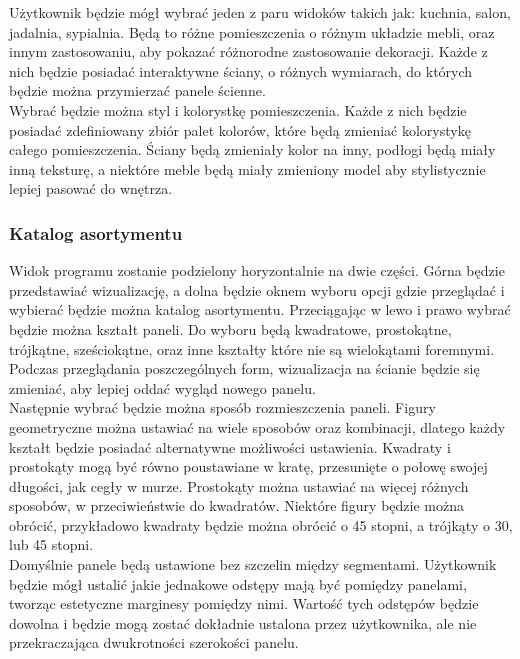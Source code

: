 \documentclass{article} %
\begin{document}
        Użytkownik będzie mógł wybrać jeden z paru widoków takich jak: kuchnia, salon, jadalnia, sypialnia. Będą to różne pomieszczenia o różnym układzie mebli, oraz innym zastosowaniu, aby pokazać różnorodne zastosowanie dekoracji. Każde z nich będzie posiadać interaktywne ściany, o różnych wymiarach, do których będzie można przymierzać panele ścienne.
        \\
        
        Wybrać będzie można styl i kolorystkę pomieszczenia. Każde z nich będzie posiadać zdefiniowany zbiór palet kolorów, które będą zmieniać kolorystykę całego pomieszczenia. Ściany będą zmieniały kolor na inny, podłogi będą miały inną teksturę, a niektóre meble będą miały zmieniony model aby stylistycznie lepiej pasować do wnętrza.
        \\
        
        \subsubsection{Katalog asortymentu}
        Widok programu zostanie podzielony horyzontalnie na dwie części. Górna będzie przedstawiać wizualizację, a dolna będzie oknem wyboru opcji gdzie przeglądać i wybierać będzie można katalog asortymentu. Przeciągając w lewo i prawo wybrać będzie można kształt paneli. Do wyboru będą kwadratowe, prostokątne, trójkątne, sześciokątne, oraz inne kształty które nie są wielokątami foremnymi. Podczas przeglądania poszczególnych form, wizualizacja na ścianie będzie się zmieniać, aby lepiej oddać wygląd nowego panelu.
        \\
        
        Następnie wybrać będzie można sposób rozmieszczenia paneli. Figury geometryczne można ustawiać na wiele sposobów oraz kombinacji, dlatego każdy kształt będzie posiadać alternatywne możliwości ustawienia. Kwadraty i prostokąty mogą być równo poustawiane w kratę, przesunięte o połowę swojej długości, jak cegły w murze. Prostokąty można ustawiać na więcej różnych sposobów, w przeciwieństwie do kwadratów. Niektóre figury będzie można obrócić, przykładowo kwadraty będzie można obrócić o 45 stopni, a trójkąty o 30, lub 45 stopni.
        \\
        
        Domyślnie panele będą ustawione bez szczelin między segmentami. Użytkownik będzie mógł ustalić jakie jednakowe odstępy mają być pomiędzy panelami, tworząc estetyczne marginesy pomiędzy nimi. Wartość tych odstępów będzie dowolna i będzie mogą zostać dokładnie ustalona przez użytkownika, ale nie przekraczająca dwukrotności szerokości panelu.
        \\
        
\end{document}
